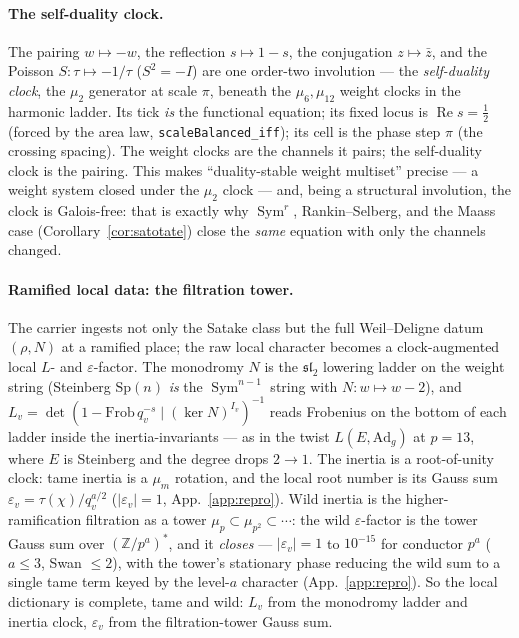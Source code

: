 \documentclass[11pt]{article}
\theoremstyle{definition}
\renewcommand{\Re}{\operatorname{Re}}
\newcommand{\Sym}{\operatorname{Sym}}
\begin{document}
\paragraph{The self-duality clock.} The pairing $w\mapsto-w$, the reflection $s\mapsto1-s$, the
conjugation $z\mapsto\bar z$, and the Poisson $S:\tau\mapsto-1/\tau$ ($S^2=-I$) are one order-two
involution --- the \emph{self-duality clock}, the $\mu_2$ generator at scale $\pi$, beneath the
$\mu_6,\mu_{12}$ weight clocks in the harmonic ladder. Its tick \emph{is} the functional equation; its
fixed locus is $\Re s=\tfrac12$ (forced by the area law, \texttt{scaleBalanced\_iff}); its cell is the
phase step $\pi$ (the crossing spacing). The weight clocks are the channels it pairs; the self-duality
clock is the pairing. This makes ``duality-stable weight multiset'' precise --- a weight system closed
under the $\mu_2$ clock --- and, being a structural involution, the clock is Galois-free: that is exactly
why $\Sym^r$, Rankin--Selberg, and the Maass case (Corollary~\ref{cor:satotate}) close the \emph{same}
equation with only the channels changed.

\paragraph{Ramified local data: the filtration tower.} The carrier ingests not only the Satake class
but the full Weil--Deligne datum $(\rho,N)$ at a ramified place; the raw local character becomes a
clock-augmented local $L$- and $\varepsilon$-factor. The monodromy $N$ is the $\mathfrak{sl}_2$ lowering
ladder on the weight string (Steinberg $\mathrm{Sp}(n)$ \emph{is} the $\Sym^{n-1}$ string with $N:w\mapsto
w-2$), and $L_v=\det(1-\mathrm{Frob}\,q_v^{-s}\mid(\ker N)^{I_v})^{-1}$ reads Frobenius on the bottom of
each ladder inside the inertia-invariants --- as in the twist $L(E,\mathrm{Ad}_g)$ at $p=13$, where $E$ is
Steinberg and the degree drops $2\to1$. The inertia is a root-of-unity clock: tame inertia is a $\mu_m$
rotation, and the local root number is its Gauss sum $\varepsilon_v=\tau(\chi)/q_v^{a/2}$ ($|\varepsilon_v|
=1$, App.~\ref{app:repro}). Wild inertia is the higher-ramification filtration as a tower $\mu_p\subset
\mu_{p^2}\subset\cdots$: the wild $\varepsilon$-factor is the tower Gauss sum over $(\mathbb Z/p^a)^*$, and
it \emph{closes} --- $|\varepsilon_v|=1$ to $10^{-15}$ for conductor $p^a$ ($a\le3$, Swan $\le2$), with the
tower's stationary phase reducing the wild sum to a single tame term keyed by the level-$a$ character
(App.~\ref{app:repro}). So the local dictionary is complete, tame and wild: $L_v$ from the monodromy
ladder and inertia clock, $\varepsilon_v$ from the filtration-tower Gauss sum.
\end{document}
